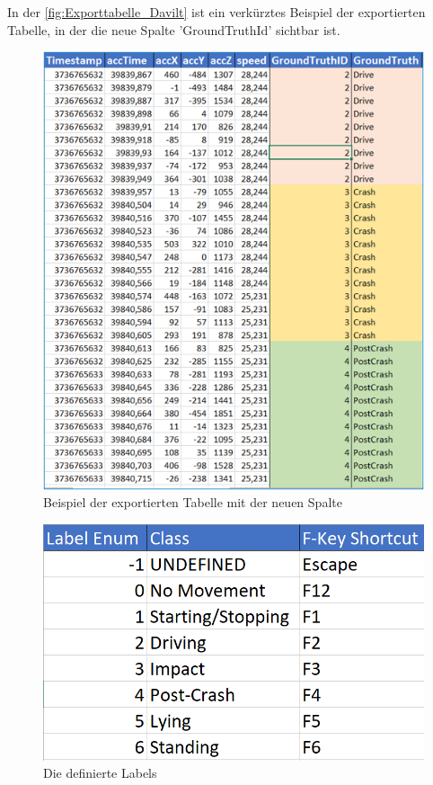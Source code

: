 In der \autoref{fig:Exporttabelle_Davilt} ist ein verkürztes Beispiel der exportierten Tabelle, in der die neue Spalte 'GroundTruthId' sichtbar ist.
\begin{figure}[H]
	\centering
	\includegraphics[width=\linewidth]{Bilder/Exporttabelle_Davilt.png}
	\caption{Beispiel der exportierten Tabelle mit der neuen Spalte}
	\label{fig:Exporttabelle_Davilt}
\end{figure}

\begin{figure}[H]
	\centering
	\includegraphics[width=0.6\linewidth]{Bilder/TabCalimotoLabelsID.png}
	\caption{Die definierte Labels}
	\label{fig:TabCalimotoLabelsID}
\end{figure}






